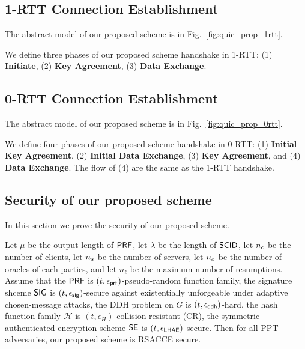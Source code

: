 \subsection{1-RTT Connection Establishment} \label{sec:quic_prop_1rtt}

The abstract model of our proposed scheme is in
Fig.~\ref{fig:quic_prop_1rtt}.



We define three phases of our proposed scheme handshake in 1-RTT:
(1) \textbf{Initiate},
(2) \textbf{Key Agreement},
(3) \textbf{Data Exchange}.





\subsection{0-RTT Connection Establishment} \label{sec:quic_prop_0rtt}

The abstract model of our proposed scheme is in
Fig.~\ref{fig:quic_prop_0rtt}.



We define four phases of our proposed scheme handshake in 0-RTT:
(1) \textbf{Initial Key Agreement},
(2) \textbf{Initial Data Exchange},
(3) \textbf{Key Agreement}, and
(4) \textbf{Data Exchange}.
The flow of (4) are the same as the 1-RTT
handshake.





\subsection{Security of our proposed scheme} \label{sec:quic_proof}

In this section we prove the security of our proposed scheme.

\begin{theorem} \label{theorem:proposed_scheme}
 Let $\mu$ be the output length of $\mathsf{PRF}$, let $\lambda$ be
 the length of $\mathsf{SCID}$, let $n_c$ be the number of
 clients, let $n_s$ be the number of servers, let
 $n_o$ be the number of oracles of each parties, and
 let $n_{\ell}$ be the maximum number of resumptions. Assume
 that the $\mathsf{PRF}$ is $(t, \epsilon_{\mathsf{prf}})$-pseudo-random
 function family, the signature shceme
 $\mathsf{SIG}$ is $(t, \epsilon_{\mathsf{sig}})$-secure against existentially
 unforgeable under adaptive chosen-message attacks, the DDH
 problem on $G$ is $(t, \epsilon_{\mathsf{ddh}})$-hard, the hash
 function family $\mathcal{H}$ is
 $(t,\epsilon_{H})$-collision-resistant (CR), the symmetric
 authenticated encryption scheme $\mathsf{SE}$ is
 $(t, \epsilon_{\mathsf{LHAE}})$-secure.
 Then for all PPT adversaries, our proposed scheme is RSACCE secure.
\end{theorem}

